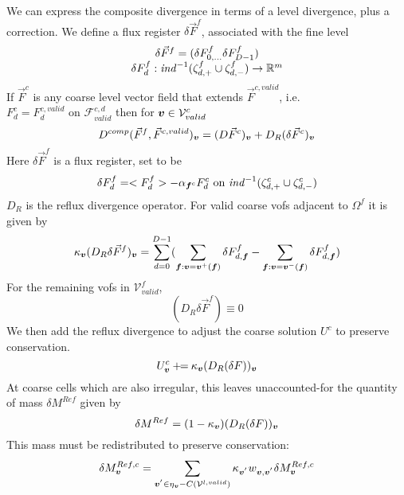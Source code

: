We can express the composite divergence in terms of a level
divergence, plus a correction. We define a flux register $\delta
\vec{F}^f$, associated with the fine level 
\begin{equation}
\begin{array}{c}
\delta \vec{F}^f = (\delta F^f_{0, \ldots} \delta F^f_{D-1}) \\
\delta F^f_d : {\it ind}^{-1}(\zeta^f_{d, +} \cup \zeta^f_{d,-}) \rightarrow
\mathbb{R}^m 
\end{array}
\end{equation}
If $\vec{F}^c$ is any coarse level vector field that extends
$\vec{F}^{c, valid}$, i.e. $F^c_d = F^{c, valid}_d \mbox{ on }
\mathcal{F}^{c,d}_{valid}$ then for ${\boldsymbol{v}} \in \mathcal{V}^c_{valid}$ 
\begin{equation}
 D^{comp}(\vec{F}^f, \vec{F}^{c, valid})_{\boldsymbol{v}} = (D \vec{F}^c)_{\boldsymbol{v}}
+ D_R(\delta \vec{F}^c)_{\boldsymbol{v}} 
\end{equation}
Here $\delta \vec{F}^f$ is a flux register, set to be
\begin{equation}
\delta F^f_d = <F^f_d> -  \alpha_{{\boldsymbol{f}}^c} F^c_d \mbox{   on } {\it ind}^{-1}(\zeta^c_{d, +}
\cup \zeta^c_{d, -}) 
\end{equation}
$D_R$ is the reflux divergence operator. For valid coarse vofs
adjacent to $\Omega^f$ it is given by 
\begin{equation}
\kappa_{\boldsymbol{v}}(D_R \delta \vec{F}^f)_{\boldsymbol{v}} = 
\sum\limits^{D-1}_{d=0}(
 \sum\limits_{{\boldsymbol{f}}:{\boldsymbol{v}}={\boldsymbol{v}}^+({\boldsymbol{f}})} \delta F^f_{d, {\boldsymbol{f}}} -
 \sum\limits_{{\boldsymbol{f}}:{\boldsymbol{v}}={\boldsymbol{v}}^-({\boldsymbol{f}})} \delta F^f_{d, {\boldsymbol{f}}})
\end{equation}
For the remaining vofs in $\mathcal{V}^f_{valid}$, 
\begin{equation}
(D_R \delta \vec{F}^f) \equiv 0
\end{equation}
We then add the reflux divergence
to adjust the coarse solution $U^c$ to preserve conservation.
\begin{equation}
U^c_{{\boldsymbol{v}}} \mathbin{+\mkern-7mu=}  \kappa_{{\boldsymbol{v}}} (D_R(\delta F))_{{\boldsymbol{v}}}
\end{equation}
At coarse cells which are also irregular, this leaves unaccounted-for 
the quantity of mass $\delta M^{Ref}$ given by
\begin{equation}
\delta M^{Ref} = (1-\kappa_{{\boldsymbol{v}}})(D_R(\delta F))_{{\boldsymbol{v}}}
\end{equation}
This mass must be redistributed to preserve conservation:
\begin{equation}
\delta M^{Ref,c}_{{\boldsymbol{v}}} = 
\sum\limits_{{{\boldsymbol{v}^{'}}} \in {\eta}_{{\boldsymbol{v}}} - C({{\cal V}^{l, valid}})}
\kappa_{{\boldsymbol{v}^{'}}} w_{{\boldsymbol{v}},{\boldsymbol{v}^{'}}} \delta M^{Ref, c}_{{\boldsymbol{v}}}
\label{eqn::redisteqn1}
\end{equation}
